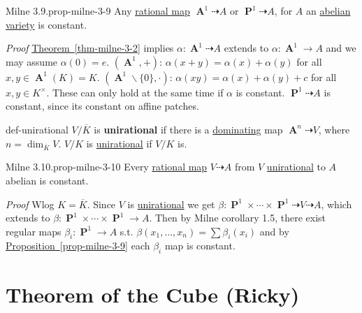 \documentclass[10pt,]{book}
\makeatletter
\newcommand{\terminology}[1]{\textbf{#1}}
\renewcommand*{\proofname}{Proof}
\renewenvironment{proof}[1][\proofname]{\par
  \pushQED{\qed}%
  \normalfont \topsep6\p@\@plus6\p@\relax
  \trivlist
  \item\relax
    {\itshape
    #1\@addpunct{.}}\hspace\labelsep\ignorespaces
}{%
  \popQED\endtrivlist\@endpefalse
}
\numberwithin{equation}{section}
\DeclareMathOperator{\aff}{\mathbf{A}}
\DeclareMathOperator{\PP}{\mathbf{P}}
\makeatother
\begin{document}
\begin{proposition}{Milne 3.9.}{}{prop-milne-3-9}%
\hypertarget{p-102}{}%
Any \hyperref[def-rational-map]{rational map} \(\aff^1 \dashrightarrow A\) or \(\PP^1 \dashrightarrow A\), for \(A\) an \hyperref[def-buntes-abvar]{abelian variety} is constant.%
\end{proposition}
\begin{proof}\hypertarget{proof-17}{}
\hypertarget{p-103}{}%
\hyperref[thm-milne-3-2]{Theorem~\ref{thm-milne-3-2}} implies \(\alpha \colon \aff^1 \dashrightarrow A\) extends to \(\alpha \colon \aff^1\to A\) and we may assume \(\alpha(0) = e\). \((\aff^1, +)\): \(\alpha(x+y) = \alpha(x) + \alpha(y)\) for all \(x,y\in \aff^1(K) = K\). \((\aff^1\smallsetminus\{0\}, \cdot)\): \(\alpha(xy) = \alpha(x) + \alpha(y) + c\) for all \(x,y\in K^\times\). These can only hold at the same time if \(\alpha\) is constant. \(\PP^1 \dashrightarrow A\) is constant, since its constant on affine patches.%
\end{proof}
\begin{definition}{}{def-unirational}%
\hypertarget{p-104}{}%
\(V/\overline K\) is \terminology{unirational} if there is a \hyperref[def-dominating-maps]{dominating} map \(\aff^n \dashrightarrow V\), where \(n = \dim_{\overline K} V\). \(V/K\) is \hyperref[def-unirational]{unirational} if \(V/K\) is.%
\end{definition}
\begin{proposition}{Milne 3.10.}{}{prop-milne-3-10}%
\hypertarget{p-105}{}%
Every \hyperref[def-rational-map]{rational map} \(V\dashrightarrow A\) from \(V\) \hyperref[def-unirational]{unirational} to \(A\) abelian is constant.%
\end{proposition}
\begin{proof}\hypertarget{proof-18}{}
\hypertarget{p-106}{}%
Wlog \(K = \overline K\). Since \(V\) is \hyperref[def-unirational]{unirational} we get \(\beta \colon \PP^1\times\cdots\times\PP^1 \dashrightarrow V\dashrightarrow A\), which extends to \(\beta \colon \PP^1\times\cdots\times\PP^1 \to A\). Then by Milne corollary 1.5, there exist regular maps \(\beta_i \colon \PP^1 \to A\) s.t. \(\beta(x_1,\ldots, x_n) = \sum \beta_i(x_i)\) and by \hyperref[prop-milne-3-9]{Proposition~\ref{prop-milne-3-9}} each \(\beta_i\) map is constant.%
\end{proof}
%
%
\typeout{************************************************}
\typeout{************************************************}
%
\section[{Theorem of the Cube (Ricky)}]{Theorem of the Cube (Ricky)}\label{sec-thm-cube}
%
%
\typeout{************************************************}
\typeout{************************************************}
%
\end{document}
